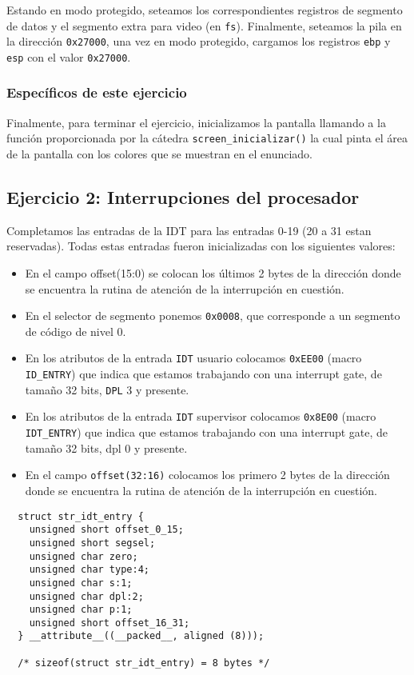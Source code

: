 \documentclass[twocolumn,10pt]{article}
\begin{document}
Estando en modo protegido, seteamos los correspondientes registros de
segmento de datos y el segmento extra para video (en
\texttt{fs}). Finalmente, seteamos la pila en la dirección
\texttt{0x27000}, una vez en modo protegido, cargamos los registros
\texttt{ebp} y \texttt{esp} con el valor \texttt{0x27000}.

\subsubsection*{Específicos de este ejercicio}

Finalmente, para terminar el ejercicio, inicializamos la pantalla
llamando a la función proporcionada por la cátedra
\texttt{screen\_inicializar()} la cual pinta el área de la pantalla
con los colores que se muestran en el enunciado.

\subsection{Ejercicio 2: Interrupciones del procesador}

Completamos las entradas de la IDT para las entradas 0-19 (20 a 31
estan reservadas). Todas estas entradas fueron inicializadas con los
siguientes valores:
\begin{itemize}
\item En el campo offset(15:0) se colocan los últimos 2 bytes de la
  dirección donde se encuentra la rutina de atención de la interrupción
  en cuestión.
\item En el selector de segmento ponemos \texttt{0x0008}, que corresponde a un
  segmento de código de nivel 0.
\item En los atributos de la entrada \texttt{IDT} usuario colocamos \texttt{0xEE00}
  (macro \texttt{ID\_ENTRY}) que indica que estamos trabajando con una
  interrupt gate, de tamaño 32 bits, \texttt{DPL} 3 y presente.
\item En los atributos de la entrada \texttt{IDT} supervisor colocamos \texttt{0x8E00}
  (macro \texttt{IDT\_ENTRY}) que indica que estamos trabajando con
  una interrupt gate, de tamaño 32 bits, dpl 0 y presente.
\item En el campo \texttt{offset(32:16)} colocamos los primero 2 bytes de la
  dirección donde se encuentra la rutina de atención de la interrupción
  en cuestión.
\end{itemize}

\begin{lstlisting}
  struct str_idt_entry {
    unsigned short offset_0_15;
    unsigned short segsel;
    unsigned char zero;
    unsigned char type:4;
    unsigned char s:1;
    unsigned char dpl:2;
    unsigned char p:1;
    unsigned short offset_16_31;
  } __attribute__((__packed__, aligned (8)));
  
  /* sizeof(struct str_idt_entry) = 8 bytes */
\end{lstlisting}
\end{document}
